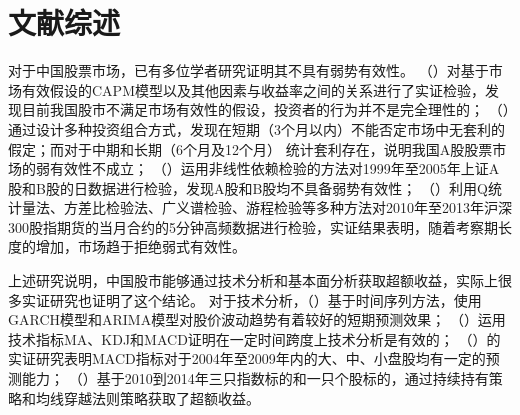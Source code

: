 
\chapter{文献综述}
对于中国股票市场，已有多位学者研究证明其不具有弱势有效性。
\citeauthor{jiaZhongGuoGuShiYouXiaoXingDeShiZhengFenXi2003}（\citeyear{jiaZhongGuoGuShiYouXiaoXingDeShiZhengFenXi2003}）对基于市场有效假设的CAPM模型以及其他因素与收益率之间的关系进行了实证检验，发现目前我国股市不满足市场有效性的假设，投资者的行为并不是完全理性的；
\citeauthor{wuZhongGuoGuPiaoShiChangRuoYouXiaoXingDeTongJiTaoLiJianYan2007}（\citeyear{wuZhongGuoGuPiaoShiChangRuoYouXiaoXingDeTongJiTaoLiJianYan2007}）通过设计多种投资组合方式，发现在短期（3个月以内）不能否定市场中无套利的假定；而对于中期和长期（6个月及12个月） 统计套利存在，说明我国A股股票市场的弱有效性不成立；
\citeauthor{limAreChineseStock2009}（\citeyear{limAreChineseStock2009}）运用非线性依赖检验的方法对1999年至2005年上证A股和B股的日数据进行检验，发现A股和B股均不具备弱势有效性；
\citeauthor{quJiYuXuLieXingZhiJianYanDeZhongGuoGuPiaoShiChangRuoShiYouXiaoXingYanJiu2014}（\citeyear{quJiYuXuLieXingZhiJianYanDeZhongGuoGuPiaoShiChangRuoShiYouXiaoXingYanJiu2014}）利用Q统计量法、方差比检验法、广义谱检验、游程检验等多种方法对2010年至2013年沪深300股指期货的当月合约的5分钟高频数据进行检验，实证结果表明，随着考察期长度的增加，市场趋于拒绝弱式有效性。

上述研究说明，中国股市能够通过技术分析和基本面分析获取超额收益，实际上很
多实证研究也证明了这个结论。
对于技术分析，\citeauthor{zhaoJiYuShiJianXuLieFenXiDeGuPiaoJieGeQuShiYuCeYanJiu2009}（\citeyear{zhaoJiYuShiJianXuLieFenXiDeGuPiaoJieGeQuShiYuCeYanJiu2009}）基于时间序列方法，使用GARCH模型和ARIMA模型对股价波动趋势有着较好的短期预测效果；
\citeauthor{wangGuShiChangYongJiShuFenXiFangFaDeYouXiaoXingShiZhengYanJiu2010}（\citeyear{wangGuShiChangYongJiShuFenXiFangFaDeYouXiaoXingShiZhengYanJiu2010}）运用技术指标MA、KDJ和MACD证明在一定时间跨度上技术分析是有效的；
\citeauthor{shiGuPiaoJiShuFenXiZhongMACDZhiBiaoDeYouXiaoXingJianYan2011}（\citeyear{shiGuPiaoJiShuFenXiZhongMACDZhiBiaoDeYouXiaoXingJianYan2011}）的实证研究表明MACD指标对于2004年至2009年内的大、中、小盘股均有一定的预测能力；
\citeauthor{baoZhongGuoGuShiJiShuFenXiYouXiaoXingYanJiu2015}（\citeyear{baoZhongGuoGuShiJiShuFenXiYouXiaoXingYanJiu2015}）基于2010到2014年三只指数标的和一只个股标的，通过持续持有策略和均线穿越法则策略获取了超额收益。

